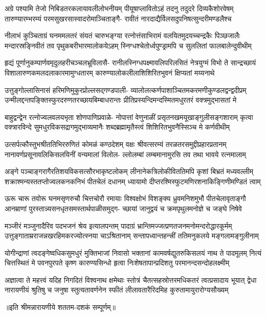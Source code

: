 

\fourlineindentedshloka
{अग्रे पश्यामि तेजो निबिडतरकलायावलीलोभनीयम्}
{पीयूषाप्लावितोऽहं तदनु तदुदरे दिव्यकैशोरवेषम्}
{तारुण्यारम्भरम्यं परमसुखरसास्वादरोमाञ्चिताङ्गै-}
{रावीतं नारदाद्यैर्विलसदुपनिषत्सुन्दरीमण्डलैश्च}

\fourlineindentedshloka
{नीलाभं कुञ्चिताग्रं घनममलतरं संयतं चारुभङ्ग्या}
{रत्नोत्तंसाभिरामं वलयितमुदयच्चन्द्रकैः पिञ्छजालैः}
{मन्दारस्रङ्निवीतं तव पृथुकबरीभारमालोकयेऽहम्}
{स्निग्धश्चेतोर्ध्वपुण्ड्रामपि च सुललितां फालबालेन्दुवीथीम्}

\fourlineindentedshloka
{हृद्यं पूर्णानुकम्पार्णवमृदुलहरीचञ्चलभ्रूविलासै-}
{रानीलस्निग्धपक्ष्मावलिपरिलसितं नेत्रयुग्मं विभो ते}
{सान्द्रच्छायं विशालारुणकमलदलाकारमामुग्धतारम्}
{कारुण्यालोकलीलाशिशिरितभुवनं क्षिप्यतां मय्यनाथे}

\fourlineindentedshloka
{उत्तुङ्गोल्लासिनासं हरिमणिमुकुरप्रोल्लसद्गण्डपाली-}
{व्यालोलत्कर्णपाशाञ्चितमकरमणीकुण्डलद्वन्द्वदीप्रम्}
{उन्मीलद्दन्तपङ्क्तिस्फुरदरुणतरच्छायबिम्बाधरान्तः}
{प्रीतिप्रस्यन्दिमन्दस्मितमधुरतरं वक्त्रमुद्भासतां मे}

\fourlineindentedshloka
{बाहुद्वन्द्वेन रत्नोज्वलवलयभृता शोणपाणिप्रवाळे-}
{नोपात्तां वेणुनाळीं प्रसृतनखमयूखाङ्गुलीसङ्गशाराम्}
{कृत्वा वक्त्रारविन्दे सुमधुरविकसद्रागमुद्भाव्यमानैः}
{शब्दब्रह्मामृतैस्त्वं शिशिरितभुवनैस्सिञ्च मे कर्णवीथीम्}

\fourlineindentedshloka
{उत्सर्पत्कौस्तुभश्रीततिभिररुणितं कोमळं कण्ठदेशम्}
{वक्षः श्रीवत्सरम्यं तरळतरसमुद्दीप्रहारप्रतानम्}
{नानावर्णप्रसूनावलिकिसलयिनीं वन्यमालां विलोल-}
{ल्लोलम्बां लम्बमानामुरसि तव तथा भावये रत्नमालाम्}

\fourlineindentedshloka
{अङ्गे पञ्चाङ्गरागैरतिशयविकसत्सौरभाकृष्टलोकम्}
{लीनानेकत्रिलोकीविततिमपि कृशां बिभ्रतं मध्यवल्लीम्}
{शक्राश्मन्यस्ततप्तोज्वलकनकनिभं पीतचेलं दधानम्}
{ध्यायामो दीप्तरश्मिस्फुटमणिरशनाकिङ्गिणीमण्डितं त्वाम्}

\fourlineindentedshloka
{ऊरू चारू तवोरू घनमसृणरुचौ चित्तचोरौ रमायाः}
{विश्वक्षोभं विशङ्क्य ध्रुवमनिशमुभौ पीतचेलावृताङ्गौ}
{आनम्राणां पुरस्तान्न्यसनधृतसमस्तार्थपाळीसमुद्ग-}
{च्छायां जानुद्वयं च क्रमपृथुलमनोज्ञे च जङ्घे निषेवे}

\fourlineindentedshloka
{मञ्जीरं मञ्जुनादैरिव पदभजनं श्रेय इत्यालपन्तम्}
{पादाग्रं भ्रान्तिमज्जत्प्रणतजनमनोमन्दरोद्धारकूर्मम्}
{उत्तुङ्गाताम्रराजन्नखरहिमकरज्योत्स्नया चाऽश्रितानाम्}
{सन्तापध्वान्तहन्त्त्रीं ततिमनुकलये मङ्गलामङ्गुलीनाम्}

\fourlineindentedshloka
{योगीन्द्राणां त्वदङ्गेष्वधिकसुमधुरं मुक्तिभाजां निवासो}
{भक्तानां कामवर्षद्युतरुकिसलयं नाथ ते पादमूलम्}
{नित्यं चित्तस्थितं मे पवनपुरपते कृष्ण कारुण्यसिन्धो}
{हृत्वा निःशेषतापान्प्रदिशतु परमानन्दसन्दोहलक्ष्मीम्}

\fourlineindentedshloka
{अज्ञात्वा ते महत्त्वं यदिह निगदितं विश्वनाथ क्षमेथाः}
{स्तोत्रं चैतत्सहस्रोत्तरमधिकतरं त्वत्प्रसादाय भूयात्}
{द्वेधा नारायणीयं श्रुतिषु च जनुषा स्तुत्यतावर्णनेन}
{स्फीतं लीलावतारैरिदमिह कुरुतामायुरारोग्यसौख्यम्}

{॥इति श्रीमन्नारायणीये शततम-दशकं सम्पूर्णम्॥}
